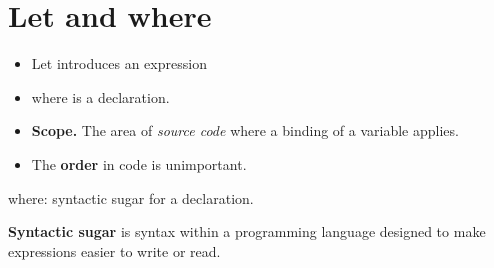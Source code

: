 \documentclass{article}
\begin{document}
   


   \section{Let and where}
   \begin{multicols}{2}
\begin{itemize} \renewcommand\labelitemi{\small \textcolor{Lavender}{$\blacksquare$}}
  \item 
   {\selectfont Let} introduces an expression 
 \item {\selectfont where} is a declaration.
\item \textbf{Scope.} The area of \textit{source code} where a binding of a variable applies. 
\item The \textbf{order} in code is unimportant.
\end{itemize}
   \end{multicols}      
   {\selectfont where}: syntactic sugar for a declaration.

       \textbf{Syntactic sugar} is syntax within a programming language designed to make expressions easier
       to write or read.
    
\end{document}
